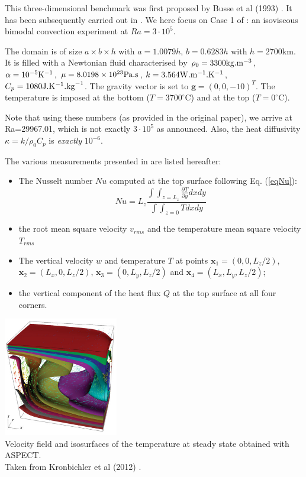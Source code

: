 
This three-dimensional benchmark was first proposed by Busse et al (1993) \cite{bucc93}. 
It has been subsequently carried out in \cite{tack94,trha98,albe00,onmm06,dawk11,krhb12}.
We here focus on Case 1 of \cite{bucc93}:  an isoviscous bimodal convection experiment at $Ra=3\cdot 10^5$.

The domain is of size $a\times b\times h$ with $a=1.0079h$, $b=0.6283h$ with $h=2700$km. It is filled with a Newtonian fluid characterised by $\rho_0=3300{\rm kg}.{\rm m}^{-3}$, $\alpha=10^{-5}{\rm K}^{-1}$, 
$\mu=8.0198\times10^{23}{\rm Pa.s}$, 
$k=3.564{\rm W}.{\rm m}^{-1}.{\rm K}^{-1}$, 
$C_p=1080{\rm J}.{\rm K}^{-1}.{\rm kg}^{-1}$.
The gravity vector is set to ${\bm g}=(0,0,-10)^T$.
The temperature is imposed at the bottom  ($T=3700^\circ$C) and at the top ($T=0^\circ$C).

Note that using these numbers (as provided in the original paper), we arrive at Ra=29967.01, which 
is not exactly $3\cdot10^5$ as announced. Also, the heat diffusivity $\kappa=k/\rho_0 C_p$ is 
{\it exactly} $10^{-6}$.

The various measurements presented in \cite{bucc93} are listed hereafter:
\begin{itemize}
\item The Nusselt number $Nu$ computed at the top surface following Eq. (\ref{eqNu}):
\[
Nu = L_z \frac{\int\int_{z=L_z} \frac{\partial T}{\partial y} dx dy  }{\int \int_{z=0} T dx dy}
\]
\item the root mean square velocity $v_{rms}$ and the temperature mean square velocity $T_{rms}$
\item The vertical velocity $w$ and temperature $T$ at points ${\bm x}_1=(0,0,L_z/2)$, ${\bm x}_2=(L_x,0,L_z/2)$,
${\bm x}_3=(0,L_y,L_z/2)$ and ${\bm x}_4=(L_x,L_y,L_z/2)$;
\item the vertical component of the heat flux $Q$ at the top surface  at all four corners. 
\end{itemize}

\begin{center}
\includegraphics[width=5cm]{python_codes/fieldstone_20/images/krhb12}\\
{\captionfont Velocity field and isosurfaces of the temperature at steady state obtained 
with ASPECT.\\ Taken from Kronbichler et al (2012) \cite{krhb12}.}
\end{center}


